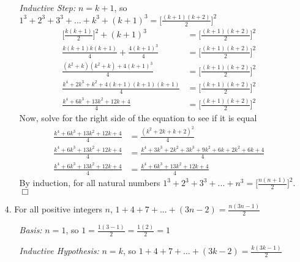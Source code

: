 \documentclass{article}
\begin{document}
\begin{itemize}
\begin{itemize}
        \item[]\emph{Inductive Step:} $n=k+1$, so $1^3+2^3+3^3+...+k^3+(k+1)^3=\Big[\frac{(k+1)(k+2)}{2}\Big]^2$
        \begin{align}
            \Big[\frac{k(k+1)}{2}\Big]^2+(k+1)^3&=\Big[\frac{(k+1)(k+2)}{2}\Big]^2\nonumber\\
            \frac{k(k+1)k(k+1)}{4}+\frac{4(k+1)^3}{4}&=\Big[\frac{(k+1)(k+2)}{2}\Big]^2\nonumber\\
            \frac{(k^2+k)(k^2+k)+4(k+1)^3}{4}&=\Big[\frac{(k+1)(k+2)}{2}\Big]^2\nonumber\\
            \frac{k^4+2k^3+k^2+4(k+1)(k+1)(k+1)}{4}&=\Big[\frac{(k+1)(k+2)}{2}\Big]^2\nonumber\\
            \frac{k^4+6k^3+13k^2+12k+4}{4}&=\Big[\frac{(k+1)(k+2)}{2}\Big]^2\nonumber
        \end{align}
        Now, solve for the right side of the equation to see if it is equal
        \begin{align}
            \frac{k^4+6k^3+13k^2+12k+4}{4}&=\frac{(k^2+2k+k+2)^2}{4}\nonumber\\
            \frac{k^4+6k^3+13k^2+12k+4}{4}&=\frac{k^4+3k^3+2k^2+3k^3+9k^2+6k+2k^2+6k+4}{4}\nonumber\\
            \frac{k^4+6k^3+13k^2+12k+4}{4}&=\frac{k^4+6k^3+13k^2+12k+4}{4}\nonumber
        \end{align}
        By induction, for all natural numbers $1^3+2^3+3^3+...+n^3=\Big[\frac{n(n+1)}{2}\Big]^2$. $\Box$
    \end{itemize}
    
    \item[4.] For all positive integers $n$, $1+4+7+...+(3n-2)=\frac{n(3n-1)}{2}$
    \begin{itemize}
        \item[]\emph{Basis:} $n=1$, so $1=\frac{1(3-1)}{2}=\frac{1(2)}{2}=1$
        
        \item[]\emph{Inductive Hypothesis:} $n=k$, so $1+4+7+...+(3k-2)=\frac{k(3k-1)}{2}$
        

\end{itemize}
\end{itemize}
\end{document}
